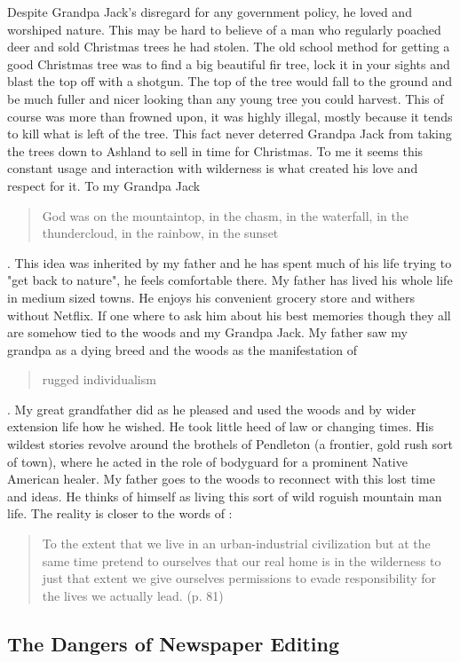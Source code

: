\documentclass[
    a4paper,
    12pt,
    man,
    donotrepeattitle
]{apa6}
\let \cite \parencite
\begin{document}
Despite Grandpa Jack's disregard for any government policy, he loved and
worshiped nature. This may be hard to believe of a man who regularly poached
deer and sold Christmas trees he had stolen. The old school method for getting
a good Christmas tree was to find a big beautiful fir tree, lock it in your
sights and blast the top off with a shotgun. The top of the tree would fall to
the ground and be much fuller and nicer looking than any young tree you could
harvest. This of course was more than frowned upon, it was highly illegal,
mostly because it tends to kill what is left of the tree. This fact never
deterred Grandpa Jack from taking the trees down to Ashland to sell in time for
Christmas. To me it seems this constant usage and interaction with wilderness
is what created his love and respect for it. To my Grandpa Jack \blockquote{God
was on
the mountaintop, in the chasm, in the waterfall, in the thundercloud, in the
rainbow, in the sunset} \cite[p. 73]{s8}. This idea was inherited by my father
and he has
spent much of his life trying to "get back to nature", he feels comfortable
there. My father has lived his whole life in medium sized towns. He enjoys his
convenient grocery store and withers without Netflix. If one where to ask him
about his best memories though they all are somehow tied to the woods and my
Grandpa Jack. My father saw my grandpa as a dying breed and the woods as the
manifestation of \blockquote{rugged individualism} \cite[p. 77]{s8}. My great 
grandfather did as he
pleased and used the woods and by wider extension life how he wished. He took
little heed of law or changing times. His wildest stories revolve around the
brothels of Pendleton (a frontier, gold rush sort of town), where he acted in
the role of bodyguard for a prominent Native American healer. My father goes to
the woods to reconnect with this lost time and ideas. He thinks of himself as
living this sort of wild roguish mountain man life. The reality is closer to
the words of \textcite{s8}: \blockquote{To the extent that we live in an
urban-industrial civilization but at the same time pretend to ourselves that
our real home is in the wilderness to just that extent we give ourselves
permissions to evade responsibility for the lives we actually lead. (p. 81)} 

\subsection{The Dangers of Newspaper Editing}
\end{document}
